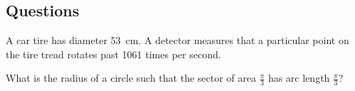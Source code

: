 \subsection*{Questions}
\begin{questions}
  \question A car tire has diameter \SI{53}{\centi\metre}. A detector measures that a particular point on the tire tread
            rotates past 1061 times per second.
  \question What is the radius of a circle such that the sector of area $ \frac{\pi}{3} $ has arc length $ \frac{\pi}{3} $?
\end{questions}


